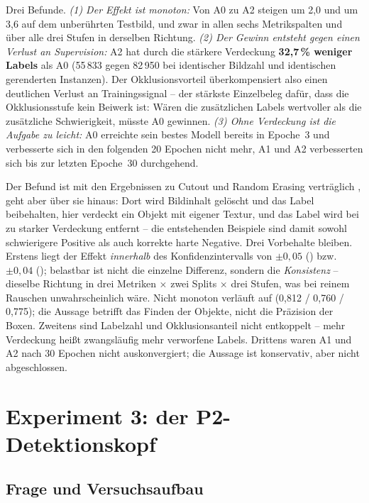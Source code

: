 Drei Befunde. \emph{(1) Der Effekt ist monoton:} Von A0 zu A2 steigen
\mAPfifty{} um 2,0\PP{} und \mAPall{} um 3,6\PP{} auf dem unberührten Testbild,
und zwar in allen sechs Metrikspalten und über alle drei Stufen in derselben
Richtung. \emph{(2) Der Gewinn entsteht gegen einen Verlust an Supervision:} A2
hat durch die stärkere Verdeckung \textbf{32,7\,\% weniger Labels} als A0
(55\,833 gegen 82\,950 bei identischer Bildzahl und identischen gerenderten
Instanzen). Der Okklusionsvorteil überkompensiert also einen deutlichen Verlust an
Trainingssignal -- der stärkste Einzelbeleg dafür, dass die Okklusionsstufe kein
Beiwerk ist: Wären die zusätzlichen Labels wertvoller als die zusätzliche
Schwierigkeit, müsste A0 gewinnen. \emph{(3) Ohne Verdeckung ist die Aufgabe zu
leicht:} A0 erreichte sein bestes Modell bereits in Epoche~3 und verbesserte sich
in den folgenden 20 Epochen nicht mehr, A1 und A2 verbesserten sich bis zur
letzten Epoche~30 durchgehend.

 Der Befund ist mit den Ergebnissen zu
Cutout und Random Erasing verträglich
\parencite{devries2017cutout,zhong2020erasing}, geht aber über sie hinaus: Dort
wird Bildinhalt gelöscht und das Label beibehalten, hier verdeckt ein Objekt mit
eigener Textur, und das Label wird bei zu starker Verdeckung entfernt -- die
entstehenden Beispiele sind damit sowohl schwierigere Positive als auch korrekte
harte Negative. Drei Vorbehalte bleiben. Erstens liegt der Effekt
\emph{innerhalb} des Konfidenzintervalls von $\pm 0{,}05$ () bzw.\
$\pm 0{,}04$ (); belastbar ist nicht die einzelne Differenz, sondern
die \emph{Konsistenz} -- dieselbe Richtung in drei Metriken $\times$ zwei Splits
$\times$ drei Stufen, was bei reinem Rauschen unwahrscheinlich wäre. Nicht monoton
verläuft \mAPseven{} auf \code{val} (0,812 / 0,760 / 0,775); die Aussage betrifft
das Finden der Objekte, nicht die Präzision der Boxen. Zweitens sind Labelzahl und
Okklusionsanteil nicht entkoppelt -- mehr Verdeckung heißt zwangsläufig mehr
verworfene Labels. Drittens waren A1 und A2 nach 30 Epochen nicht auskonvergiert;
die Aussage ist konservativ, aber nicht abgeschlossen.

\section{Experiment 3: der P2-Detektionskopf}
\label{sec:p2}

\subsection{Frage und Versuchsaufbau}

